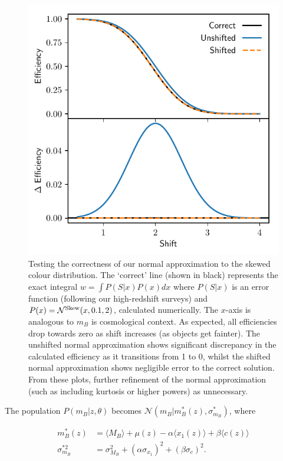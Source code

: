 \documentclass[a4paper,fleqn,usenatbib]{mnras}
\begin{document}
\begin{figure}
	\begin{center}
		\includegraphics[width=\columnwidth]{shift.pdf}
	\end{center}
	\caption{Testing the correctness of our normal approximation to the skewed colour distribution. The `correct' line (shown in black) represents the exact integral $w = \int P(S|x) P(x) dx$ where $P(S|x)$ is an error function (following our high-redshift surveys) and $P(x) = \mathcal{N}^{\rm Skew}(x, 0.1, 2)$, calculated numerically. The $x$-axis is analogous to $m_B$ is cosmological context. As expected, all efficiencies drop towards zero as shift increases (as objects get fainter). The unshifted normal approximation shows significant discrepancy in the calculated efficiency as it transitions from 1 to 0, whilst the shifted normal approximation shows negligible error to the correct solution. From these plots, further refinement of the normal approximation (such as including kurtosis or higher powers) as unnecessary.}
	\label{fig:shift}
\end{figure}



The population $P(m_B | z, \theta)$ becomes $\mathcal{N}(m_B|m_B^*(z), \sigma^*_{m_B})$, where

\begin{align}
m_B^*(z) &= \langle M_B \rangle + \mu(z) - \alpha \langle x_1(z) \rangle + \beta \langle c(z) \rangle \\
\sigma^{*2}_{m_B} &= \sigma_{M_B}^2 + (\alpha \sigma_{x_1})^2 + (\beta \sigma_c)^2.
\end{align}
\end{document}
